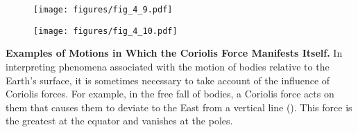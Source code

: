 \begin{figure}[t]
	\begin{minipage}[t]{0.5\linewidth}
		\begin{center}
			\texttt{[image: figures/fig\_4\_9.pdf]}
			\caption[]{}
			\label{fig:4_9}
		\end{center}
	\end{minipage}
	\hspace{-0.05cm}
	\begin{minipage}[t]{0.5\linewidth}
		\begin{center}
			\texttt{[image: figures/fig\_4\_10.pdf]}
			\caption[]{}
			\label{fig:4_10}
		\end{center}
	\end{minipage}
\end{figure}

\textbf{Examples of Motions in Which the Coriolis Force Manifests Itself.} In interpreting phenomena associated with the motion of bodies relative to the Earth's surface, it is sometimes necessary to take account of the influence of Coriolis forces. For example, in the free fall of bodies, a Coriolis force acts on them that causes them to deviate to the East from a vertical line (). This force is the greatest at the equator and vanishes at the poles.

